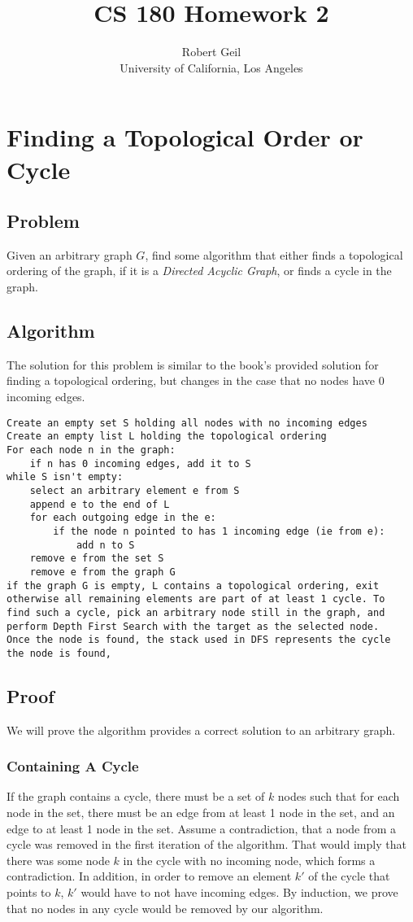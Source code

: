 \documentclass[titlepage]{article}
\title{CS 180 Homework 2}
\author{Robert Geil \\
University of California, Los Angeles
}
\numberwithin{equation}{subsection}
\begin{document}
\maketitle
\section{Finding a Topological Order or Cycle}
\subsection{Problem}
Given an arbitrary graph $G$, find some algorithm that either
finds a topological ordering of the graph, if it is a \textit{Directed 
Acyclic Graph}, or finds a cycle in the graph. 
\subsection{Algorithm}
The solution for this problem is similar to the book's provided
solution for finding a topological ordering, but changes in the
case that no nodes have 0 incoming edges.
\begin{lstlisting}
Create an empty set S holding all nodes with no incoming edges
Create an empty list L holding the topological ordering
For each node n in the graph:
    if n has 0 incoming edges, add it to S
while S isn't empty:
    select an arbitrary element e from S
    append e to the end of L
    for each outgoing edge in the e:
        if the node n pointed to has 1 incoming edge (ie from e):
            add n to S
    remove e from the set S
    remove e from the graph G
if the graph G is empty, L contains a topological ordering, exit
otherwise all remaining elements are part of at least 1 cycle. To
find such a cycle, pick an arbitrary node still in the graph, and
perform Depth First Search with the target as the selected node.
Once the node is found, the stack used in DFS represents the cycle
the node is found, 
\end{lstlisting}
\subsection{Proof}
We will prove the algorithm provides a correct solution to an arbitrary
graph.
\subsubsection{Containing A Cycle}
If the graph contains a cycle, there must be a set of $k$ nodes
such that for each node in the set, there must be an edge from
at least 1 node in the set, and an edge to at least 1 node in the
set. Assume a contradiction, that a node from a cycle was removed in
the first iteration of the algorithm. That would imply that there was
some node $k$ in the cycle with no incoming node, which forms a contradiction.
In addition, in order to remove an element $k'$ of the cycle that points to $k$,
$k'$ would have to not have incoming edges. By induction, we prove that
no nodes in any cycle would be removed by our algorithm.
\end{document}

